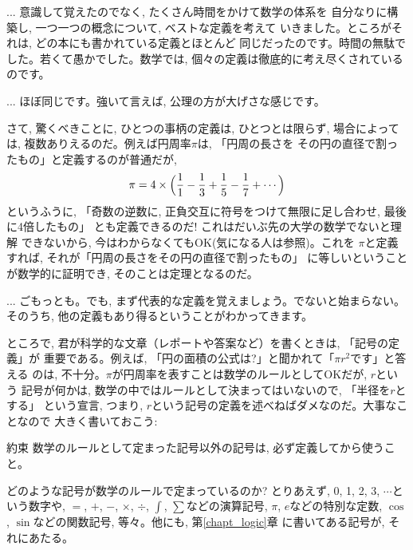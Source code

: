\begin{faq}{\small{} 
... 意識して覚えたのでなく, たくさん時間をかけて数学の体系を
自分なりに構築し, 一つ一つの概念について, ベストな定義を考えて
いきました。ところがそれは, どの本にも書かれている定義とほとんど
同じだったのです。時間の無駄でした。若くて愚かでした。数学では, 
個々の定義は徹底的に考え尽くされているのです。}\end{faq}

\begin{faq}{\small{} 
... ほぼ同じです。強いて言えば, 公理の方が大げさな感じです。}\end{faq}
\mv

さて, 驚くべきことに, ひとつの事柄の定義は, ひとつとは限らず, 
場合によっては, 複数ありえるのだ。例えば円周率$\pi$は, 「円周の長さを
その円の直径で割ったもの」と定義するのが普通だが, 
\begin{eqnarray*}
\pi=4\times\Bigl(\frac{1}{1}-\frac{1}{3}+\frac{1}{5}-\frac{1}{7}+\cdots\Bigr)
\end{eqnarray*}
というふうに, 「奇数の逆数に, 正負交互に符号をつけて無限に足し合わせ, 最後に4倍したもの」
とも定義できるのだ! これはだいぶ先の大学の数学でないと理解
できないから, 今はわからなくてもOK(気になる人は参照)。これを
$\pi$と定義すれば, それが「円周の長さをその円の直径で割ったもの」
に等しいということが数学的に証明でき, そのことは定理となるのだ。\mv

\begin{faq}{\small{} 
... ごもっとも。でも, まず代表的な定義を覚えましょう。でないと始まらない。
そのうち, 他の定義もあり得るということがわかってきます。}\end{faq}
\mv

ところで, 君が科学的な文章（レポートや答案など）を書くときは, 「記号の定義」が
重要である。例えば, 「円の面積の公式は?」と聞かれて「$\pi r^2$です」と答える
のは, 不十分。$\pi$が円周率を表すことは数学のルールとしてOKだが, $r$という
記号が何かは, 数学の中ではルールとして決まってはいないので, 「半径を$r$とする」
という宣言, つまり, $r$という記号の定義を述べねばダメなのだ。大事なことなので
大きく書いておこう:
\begin{itembox}{約束}
数学のルールとして定まった記号以外の記号は, 必ず定義してから使うこと。
\end{itembox}

どのような記号が数学のルールで定まっているのか? とりあえず, 
0, 1, 2, 3, $\cdots$という数字や, $=$, $+$, $-$, $\times$, $\div$, 
$\int$, $\sum$などの演算記号, $\pi$, $e$などの特別な定数, 
$\cos$, $\sin$などの関数記号, 等々。他にも, 第\ref{chapt_logic}章
に書いてある記号が, それにあたる。\\



